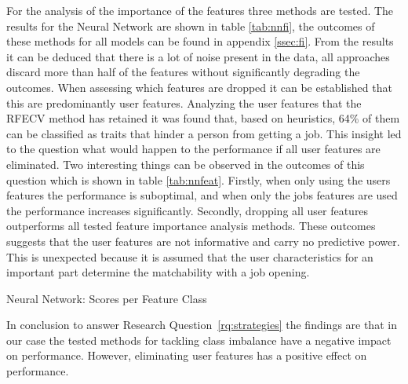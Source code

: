 For the analysis of the importance of the features three methods are tested. 
The results for the Neural Network are shown in table \ref{tab:nnfi}, the outcomes of these methods for all models can be found in appendix \ref{ssec:fi}.
From the results it can be deduced that there is a lot of noise present in the data, all approaches discard more than half of the features without significantly degrading the outcomes.
When assessing which features are dropped it can be established that this are predominantly user features.
Analyzing the user features that the RFECV method has retained it was found that, based on heuristics, 64\% of them can be classified as traits that hinder a person from getting a job.
This insight led to the question what would happen to the performance if all user features are eliminated.
Two interesting things can be observed in the outcomes of this question which is shown in table \ref{tab:nnfeat}.
Firstly, when only using the users features the performance is suboptimal, and when only the jobs features are used the performance increases significantly.
Secondly, dropping all user features outperforms all tested feature importance analysis methods.
These outcomes suggests that the user features are not informative and carry no predictive power.
This is unexpected because it is assumed that the user characteristics for an important part determine the matchability with a job opening.

\begin{table}[h]
\begin{footnotesize}

\end{footnotesize}
\caption{\label{tab:nnfeat} \footnotesize{Neural Network: Scores per Feature Class}}
\end{table}

In conclusion to answer Research Question~\ref{rq:strategies} the findings are that in our case the tested methods for tackling class imbalance have a negative impact on performance.
However, eliminating user features has a positive effect on performance.

